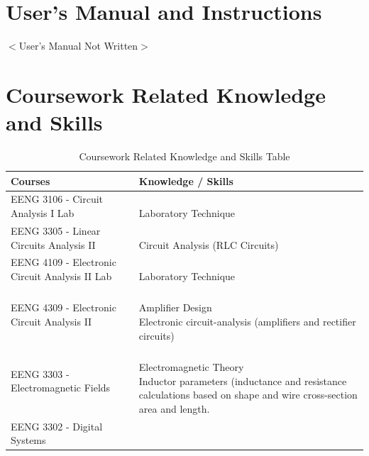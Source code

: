 \documentclass[12pt]{article}
\begin{document}
\begin{appendices}
\section{User's Manual and Instructions}

\begin{center}
$<$User's Manual Not Written$>$\\
\end{center}

\pagebreak

\section{Coursework Related Knowledge and Skills}

\begin{table}[h!]
\centering
\caption{Coursework Related Knowledge and Skills Table}
\begin{tabular}{ | l | l | }
\hline
\parbox{0.4\linewidth}{\centering
\textbf{Courses}
} &  \parbox{0.5\linewidth}{\centering
\textbf{Knowledge / Skills}
}\\
\hline
\parbox{0.4\linewidth}{\raggedleft
EENG 3106 - Circuit Analysis I Lab
} &   \parbox{0.5\linewidth}{\hfill \\
Laboratory Technique
}\\
\hline
\parbox{0.4\linewidth}{\raggedleft
EENG 3305 - Linear Circuits Analysis II
} &   \parbox{0.5\linewidth}{\hfill \\
Circuit Analysis (RLC Circuits)
}\\
\hline
\parbox{0.4\linewidth}{\raggedleft
EENG 4109 - Electronic Circuit Analysis II Lab
} &   \parbox{0.5\linewidth}{\hfill \\
Laboratory Technique
}\\
\hline
\parbox{0.4\linewidth}{\raggedleft
EENG 4309 - Electronic Circuit Analysis II
} &   \parbox{0.5\linewidth}{\hfill \\
Amplifier Design\\
Electronic circuit-analysis (amplifiers and rectifier circuits)
}\\
\hline
\parbox{0.4\linewidth}{\raggedleft
EENG 3303 - Electromagnetic Fields
} &   \parbox{0.5\linewidth}{\hfill \\
Electromagnetic Theory\\
Inductor parameters (inductance and resistance calculations based on shape and wire cross-section area and length.
}\\
\hline
\parbox{0.4\linewidth}{\raggedleft
EENG 3302 - Digital Systems
}
\end{tabular}
\end{table}
\end{appendices}
\end{document}
